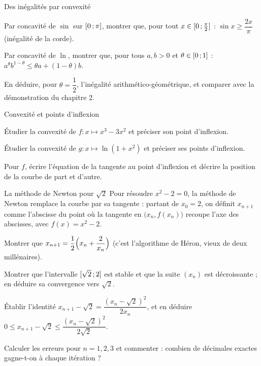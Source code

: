 \begin{exercice}[2]{Des inégalités par convexité}
\begin{questions}
  \item Par concavité de $\sin$ sur $\mathopen{[}0\,{;}\,\pi\mathclose{]}$, montrer que, pour tout
    $x\in\mathopen{[}0\,{;}\,\frac{\pi}{2}\mathclose{]}$ :
    $\sin x\geq\dfrac{2x}{\pi}$ (inégalité de la corde).
  \item Par concavité de $\ln$, montrer que, pour tous $a,b>0$ et
    $\theta\in\mathopen{[}0\,{;}\,1\mathclose{]}$ :
    $a^{\theta}b^{1-\theta}\leq\theta a+(1-\theta)b$.
  \item En déduire, pour $\theta=\dfrac12$, l'inégalité
    arithmético-géométrique, et comparer avec la démonstration du
    chapitre 2.
\end{questions}
\end{exercice}

\begin{exercice}[2]{Convexité et points d'inflexion}
\begin{questions}
  \item Étudier la convexité de $f:x\mapsto x^{3}-3x^{2}$ et préciser son
    point d'inflexion.
  \item Étudier la convexité de $g:x\mapsto\ln(1+x^{2})$ et préciser ses
    points d'inflexion.
  \item Pour $f$, écrire l'équation de la tangente au point d'inflexion et
    décrire la position de la courbe de part et d'autre.
\end{questions}
\end{exercice}


\begin{exercice}[3]{La méthode de Newton pour $\sqrt2$}
Pour résoudre $x^{2}-2=0$, la méthode de Newton remplace la courbe par sa
tangente : partant de $x_0=2$, on définit $x_{n+1}$ comme l'abscisse du
point où la tangente en $\bigl(x_n,f(x_n)\bigr)$ recoupe l'axe des
abscisses, avec $f(x)=x^{2}-2$.
\begin{questions}
  \item Montrer que $x_{n+1}=\dfrac12\Bigl(x_n+\dfrac{2}{x_n}\Bigr)$
    (c'est l'algorithme de Héron, vieux de deux millénaires).
  \item Montrer que l'intervalle $\mathopen{[}\sqrt2\,{;}\,2\mathclose{]}$ est stable et que la
    suite $(x_n)$ est décroissante ; en déduire sa convergence vers
    $\sqrt2$.
  \item Établir l'identité
    $x_{n+1}-\sqrt2=\dfrac{(x_n-\sqrt2)^{2}}{2x_n}$, et en déduire
    $0\leq x_{n+1}-\sqrt2\leq\dfrac{(x_n-\sqrt2)^{2}}{2\sqrt2}$.
  \item Calculer les erreurs pour $n=1,2,3$ et commenter : combien de
    décimales exactes gagne-t-on à chaque itération ?
\end{questions}
\end{exercice}

